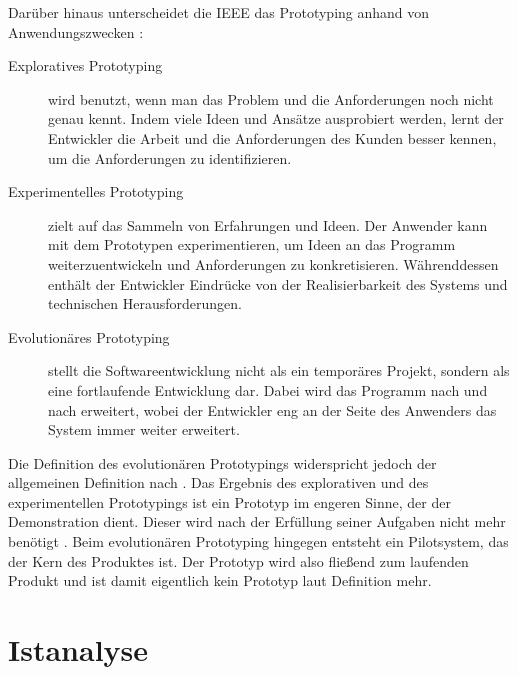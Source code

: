 \documentclass [12pt, a4paper, oneside, titlepage, ngerman]{article}
\begin{document}
\noindent Darüber hinaus unterscheidet die IEEE das Prototyping anhand von Anwendungszwecken \cite[vgl.][S.826]{ieeeprot}: 
\begin{description}
\item[Exploratives Prototyping] wird benutzt, wenn man das Problem und die Anforderungen noch nicht genau kennt. Indem viele Ideen und Ansätze ausprobiert werden, lernt der Entwickler die Arbeit und die Anforderungen des Kunden besser kennen, um die Anforderungen zu identifizieren.
\item[Experimentelles Prototyping] zielt auf das Sammeln von Erfahrungen und Ideen. Der Anwender kann mit dem Prototypen experimentieren, um Ideen an das Programm weiterzuentwickeln und Anforderungen zu konkretisieren. Währenddessen enthält der Entwickler Eindrücke von der Realisierbarkeit des Systems und technischen Herausforderungen.
\item[Evolutionäres Prototyping] stellt die Softwareentwicklung nicht als ein temporäres Projekt, sondern als eine fortlaufende Entwicklung dar. Dabei wird das Programm nach und nach erweitert, wobei der Entwickler eng an der Seite des Anwenders das System immer weiter erweitert.
\end{description}
Die Definition des evolutionären Prototypings widerspricht jedoch der allgemeinen Definition nach \cite{gabler}. Das Ergebnis des explorativen und des experimentellen Prototypings ist ein Prototyp im engeren Sinne, der der Demonstration dient. Dieser wird nach der Erfüllung seiner Aufgaben nicht mehr benötigt \cite[vgl.][S.21]{liggesmeyer2012}. Beim evolutionären Prototyping hingegen entsteht ein Pilotsystem, das der Kern des Produktes ist. Der Prototyp wird also fließend zum laufenden Produkt \cite[vgl.][S.24]{liggesmeyer2012} und ist damit eigentlich kein Prototyp laut Definition mehr.

\newpage

\section {Istanalyse}
\end{document}
